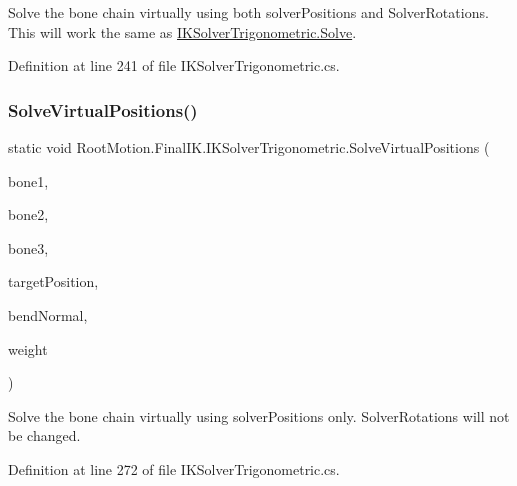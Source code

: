 Solve the bone chain virtually using both solver\+Positions and Solver\+Rotations. This will work the same as \mbox{\hyperlink{class_root_motion_1_1_final_i_k_1_1_i_k_solver_trigonometric_ae9c8628f1df3c4524407e94a2d303c5f}{I\+K\+Solver\+Trigonometric.\+Solve}}. 



Definition at line 241 of file I\+K\+Solver\+Trigonometric.\+cs.

\mbox{\label{class_root_motion_1_1_final_i_k_1_1_i_k_solver_trigonometric_a628f0c52670d60945c8b8e9fb5978778}} 
\subsubsection{\texorpdfstring{Solve\+Virtual\+Positions()}{SolveVirtualPositions()}}
{\footnotesize\ttfamily static void Root\+Motion.\+Final\+I\+K.\+I\+K\+Solver\+Trigonometric.\+Solve\+Virtual\+Positions (\begin{DoxyParamCaption}\item[{\mbox{\hyperlink{class_root_motion_1_1_final_i_k_1_1_i_k_solver_1_1_bone}{I\+K\+Solver.\+Bone}}}]{bone1,  }\item[{\mbox{\hyperlink{class_root_motion_1_1_final_i_k_1_1_i_k_solver_1_1_bone}{I\+K\+Solver.\+Bone}}}]{bone2,  }\item[{\mbox{\hyperlink{class_root_motion_1_1_final_i_k_1_1_i_k_solver_1_1_bone}{I\+K\+Solver.\+Bone}}}]{bone3,  }\item[{Vector3}]{target\+Position,  }\item[{Vector3}]{bend\+Normal,  }\item[{float}]{weight }\end{DoxyParamCaption})\hspace{0.3cm}{\ttfamily [static]}}



Solve the bone chain virtually using solver\+Positions only. Solver\+Rotations will not be changed. 



Definition at line 272 of file I\+K\+Solver\+Trigonometric.\+cs.

